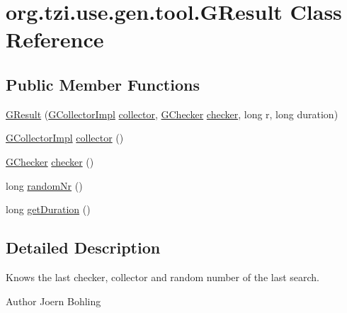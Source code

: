 \hypertarget{classorg_1_1tzi_1_1use_1_1gen_1_1tool_1_1_g_result}{\section{org.\-tzi.\-use.\-gen.\-tool.\-G\-Result Class Reference}
\label{classorg_1_1tzi_1_1use_1_1gen_1_1tool_1_1_g_result}
}
\subsection*{Public Member Functions}
\begin{DoxyCompactItemize}
\item 
\hyperlink{classorg_1_1tzi_1_1use_1_1gen_1_1tool_1_1_g_result_a9d84a7bb69f33149eec679746a9a2d5c}{G\-Result} (\hyperlink{classorg_1_1tzi_1_1use_1_1gen_1_1tool_1_1_g_collector_impl}{G\-Collector\-Impl} \hyperlink{classorg_1_1tzi_1_1use_1_1gen_1_1tool_1_1_g_result_a4b7997a8cbf32ec3dc82e1f2539f9164}{collector}, \hyperlink{classorg_1_1tzi_1_1use_1_1gen_1_1tool_1_1_g_checker}{G\-Checker} \hyperlink{classorg_1_1tzi_1_1use_1_1gen_1_1tool_1_1_g_result_a33445b74b7dc8d49a5398244b2d24130}{checker}, long r, long duration)
\item 
\hyperlink{classorg_1_1tzi_1_1use_1_1gen_1_1tool_1_1_g_collector_impl}{G\-Collector\-Impl} \hyperlink{classorg_1_1tzi_1_1use_1_1gen_1_1tool_1_1_g_result_a4b7997a8cbf32ec3dc82e1f2539f9164}{collector} ()
\item 
\hyperlink{classorg_1_1tzi_1_1use_1_1gen_1_1tool_1_1_g_checker}{G\-Checker} \hyperlink{classorg_1_1tzi_1_1use_1_1gen_1_1tool_1_1_g_result_a33445b74b7dc8d49a5398244b2d24130}{checker} ()
\item 
long \hyperlink{classorg_1_1tzi_1_1use_1_1gen_1_1tool_1_1_g_result_a00d61e6c5fc96fb8a9e6419e039e1407}{random\-Nr} ()
\item 
long \hyperlink{classorg_1_1tzi_1_1use_1_1gen_1_1tool_1_1_g_result_a6853f03fd84334c7c762307690b45b53}{get\-Duration} ()
\end{DoxyCompactItemize}


\subsection{Detailed Description}
Knows the last checker, collector and random number of the last search. \begin{DoxyAuthor}{Author}
Joern Bohling 
\end{DoxyAuthor}


